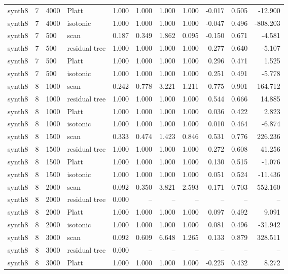 \begin{tabular}{lrllrrrrrrr}
synth8 & 7 & 4000 & Platt & 1.000 & 1.000 & 1.000 & 1.000 & -0.017 & 0.505 & -12.900 \\
synth8 & 7 & 4000 & isotonic & 1.000 & 1.000 & 1.000 & 1.000 & -0.047 & 0.496 & -808.203 \\
synth8 & 7 & 500 & scan & 0.187 & 0.349 & 1.862 & 0.095 & -0.150 & 0.671 & -4.581 \\
synth8 & 7 & 500 & residual tree & 1.000 & 1.000 & 1.000 & 1.000 & 0.277 & 0.640 & -5.107 \\
synth8 & 7 & 500 & Platt & 1.000 & 1.000 & 1.000 & 1.000 & 0.296 & 0.471 & 1.525 \\
synth8 & 7 & 500 & isotonic & 1.000 & 1.000 & 1.000 & 1.000 & 0.251 & 0.491 & -5.778 \\
synth8 & 8 & 1000 & scan & 0.242 & 0.778 & 3.221 & 1.211 & 0.775 & 0.901 & 164.712 \\
synth8 & 8 & 1000 & residual tree & 1.000 & 1.000 & 1.000 & 1.000 & 0.544 & 0.666 & 14.885 \\
synth8 & 8 & 1000 & Platt & 1.000 & 1.000 & 1.000 & 1.000 & 0.036 & 0.422 & 2.823 \\
synth8 & 8 & 1000 & isotonic & 1.000 & 1.000 & 1.000 & 1.000 & 0.010 & 0.464 & -6.874 \\
synth8 & 8 & 1500 & scan & 0.333 & 0.474 & 1.423 & 0.846 & 0.531 & 0.776 & 226.236 \\
synth8 & 8 & 1500 & residual tree & 1.000 & 1.000 & 1.000 & 1.000 & 0.272 & 0.608 & 41.256 \\
synth8 & 8 & 1500 & Platt & 1.000 & 1.000 & 1.000 & 1.000 & 0.130 & 0.515 & -1.076 \\
synth8 & 8 & 1500 & isotonic & 1.000 & 1.000 & 1.000 & 1.000 & 0.051 & 0.524 & -11.436 \\
synth8 & 8 & 2000 & scan & 0.092 & 0.350 & 3.821 & 2.593 & -0.171 & 0.703 & 552.160 \\
synth8 & 8 & 2000 & residual tree & 0.000 & -- & -- & -- & -- & -- & -- \\
synth8 & 8 & 2000 & Platt & 1.000 & 1.000 & 1.000 & 1.000 & 0.097 & 0.492 & 9.091 \\
synth8 & 8 & 2000 & isotonic & 1.000 & 1.000 & 1.000 & 1.000 & 0.081 & 0.496 & -31.942 \\
synth8 & 8 & 3000 & scan & 0.092 & 0.609 & 6.648 & 1.265 & 0.133 & 0.879 & 328.511 \\
synth8 & 8 & 3000 & residual tree & 0.000 & -- & -- & -- & -- & -- & -- \\
synth8 & 8 & 3000 & Platt & 1.000 & 1.000 & 1.000 & 1.000 & -0.225 & 0.432 & 8.272 \\

\end{tabular}
